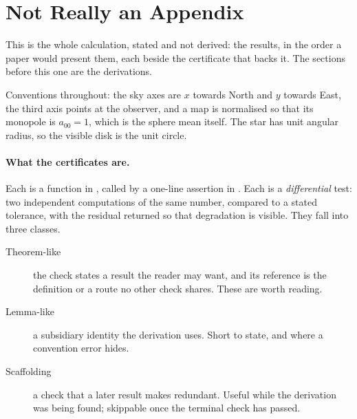 %

\appendix
\setcounter{equation}{0}
\renewcommand{\theequation}{A\arabic{equation}}
\section{Not Really an Appendix}
\label{sec:summary}

This is the whole calculation, stated and not derived: the results, in the order a paper
would present them, each beside the certificate that backs it.  The sections before this one
are the derivations.

Conventions throughout: the sky axes are $x$ towards North and $y$ towards East, the third
axis points at the observer, and a map is normalised so that its monopole is
$a_{00} = 1$, which is the sphere mean itself.  The star has unit angular radius, so the
visible disk is the unit circle.

\paragraph{What the certificates are.}  Each is a function in
, called by a one-line assertion in
.  Each is a \emph{differential} test: two independent computations of the
same number, compared to a stated tolerance, with the residual returned so that degradation is
visible.  They fall into three classes.

\begin{description}
\item[Theorem-like] the check states a result the reader may want, and its reference is the
  definition or a route no other check shares.  These are worth reading.
\item[Lemma-like] a subsidiary identity the derivation uses.  Short to state, and where a
  convention error hides.
\item[Scaffolding] a check that a later result makes redundant.  Useful while the
  derivation was being found; skippable once the terminal check has passed.
\end{description}


